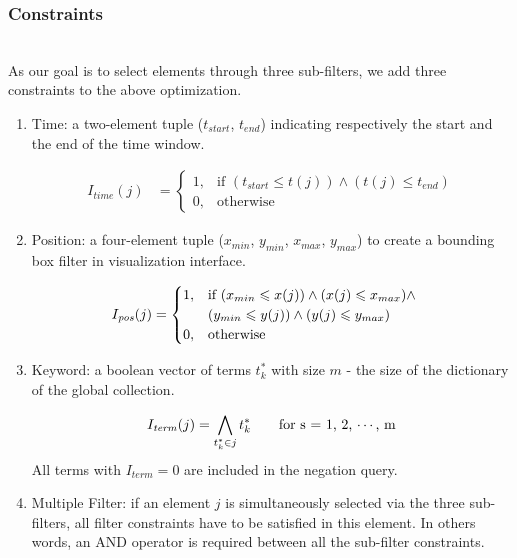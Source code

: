 \subsubsection{Constraints} \hfill \\
As our goal is to select elements through three sub-filters, we add three constraints to the above optimization.
\begin{enumerate}
\item Time: a two-element tuple ($t_{start}$, $t_{end}$) indicating respectively the start and the end of the time window.

\begin{equation}
\begin{aligned}
  I_{\mathit{time}}(j) &=
   \begin{cases}
     1, & \text{if $(t_{start} \leqslant t(j)) \land (t(j) \leqslant t_{end})$}  \\
     0, & \text{otherwise}
  \end{cases}
\end{aligned}
\end{equation}

\item Position: a four-element tuple ($x_{min}$, $y_{min}$, $x_{max}$, $y_{max}$) to create a bounding box filter in visualization interface.

\begin{equation}
\begin{aligned}
I_{\mathit{pos}}(j) & =\begin{cases}
1, & \text{if \ensuremath{(x_{min}\leqslant x(j))\land(x(j)\leqslant x_{max})\land}}\\
 & (y_{min}\leqslant y(j))\land(y(j)\leqslant y_{max})\\
0, & \text{otherwise}
\end{cases}
\end{aligned}
\end{equation}

\item Keyword: a boolean vector of terms $t^*_k$ with size $m$ - the size of the dictionary of the global collection.

\begin{equation}
  I_{\mathit{term}}(j) = \bigwedge_{t^*_k \in j} t^*_k \qquad \textnormal{for s = 1, 2, $\cdots$, m}
\end{equation}
All terms with $I_{\mathit{term}}=0$ are included in the negation query.


\item Multiple Filter: if an element $j$ is simultaneously selected via the three sub-filters, all filter constraints have to be satisfied in this element. In others words, an AND operator is required between all the sub-filter constraints.


\end{enumerate}
